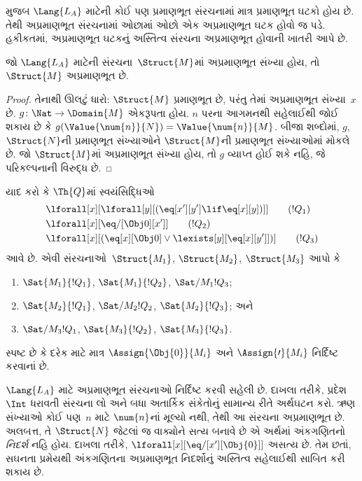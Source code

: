 \begin{explain}
 મુજબ $\Lang{L_A}$ માટેની કોઈ પણ
પ્રમાણભૂત સંરચનામાં માત્ર પ્રમાણભૂત ઘટકો હોય છે. તેથી
અપ્રમાણભૂત સંરચનામાં ઓછામાં ઓછો એક અપ્રમાણભૂત ઘટક હોવો જ પડે.
હકીકતમાં, અપ્રમાણભૂત ઘટકનું અસ્તિત્વ સંરચના અપ્રમાણભૂત હોવાની
ખાતરી આપે છે.
\end{explain}

\begin{prop}
જો $\Lang{L_A}$ માટેની સંરચના~$\Struct{M}$માં અપ્રમાણભૂત
સંખ્યા હોય, તો $\Struct{M}$ અપ્રમાણભૂત છે.
\end{prop}

\begin{proof}
તેનાથી ઊલટું ધારો: $\Struct{M}$ પ્રમાણભૂત છે, પરંતુ તેમાં અપ્રમાણભૂત
સંખ્યા~$x$ છે. $g\colon\Nat\to\Domain{M}$ એકરૂપતા હોય. $n$ પરના
આગમનથી સહેલાઈથી જોઈ શકાય છે કે
$g(\Value{\num{n}}{N})=\Value{\num{n}}{M}$. બીજા શબ્દોમાં, $g$,
$\Struct{N}$ની પ્રમાણભૂત સંખ્યાઓને $\Struct{M}$ની પ્રમાણભૂત
સંખ્યાઓમાં મોકલે છે. જો $\Struct{M}$માં અપ્રમાણભૂત સંખ્યા હોય, તો
$g$ વ્યાપ્ત હોઈ શકે નહિ, જે પરિકલ્પનાની વિરુદ્ધ છે.
\end{proof}

\begin{prob}
યાદ કરો કે $\Th{Q}$માં સ્વયંસિદ્ધિઓ
\begin{align*}
& \lforall[x][\lforall[y][(\eq[x'][y'] \lif \eq[x][y])]] \tag{$!Q_1$}\\
& \lforall[x][\eq/[\Obj 0][x']] \tag{$!Q_2$}\\
& \lforall[x][(\eq[x][\Obj 0] \lor \lexists[y][\eq[x][y']])] \tag{$!Q_3$}
\end{align*}
આવે છે. એવી સંરચનાઓ~$\Struct{M_1}$, $\Struct{M_2}$,
$\Struct{M_3}$ આપો કે
\begin{enumerate}
\item $\Sat{M_1}{!Q_1}$, $\Sat{M_1}{!Q_2}$, $\Sat/{M_1}{!Q_3}$;
\item $\Sat{M_2}{!Q_1}$, $\Sat/{M_2}{!Q_2}$, $\Sat{M_2}{!Q_3}$; અને
\item $\Sat/{M_3}{!Q_1}$, $\Sat{M_3}{!Q_2}$, $\Sat{M_3}{!Q_3}$.
\end{enumerate}
સ્પષ્ટ છે કે દરેક માટે માત્ર $\Assign{\Obj{0}}{M_i}$ અને
$\Assign{\prime}{M_i}$ નિર્દિષ્ટ કરવાનાં છે.
\end{prob}

\begin{explain}
$\Lang{L_A}$ માટે અપ્રમાણભૂત સંરચનાઓ નિર્દિષ્ટ કરવી સહેલી છે.
દાખલા તરીકે, પ્રદેશ~$\Int$ ધરાવતી સંરચના લો અને બધા અતાર્કિક
સંકેતોનું સામાન્ય રીતે અર્થઘટન કરો. ઋણ સંખ્યાઓ કોઈ પણ~$n$ માટે
$\num{n}$નાં મૂલ્યો નથી, તેથી આ સંરચના અપ્રમાણભૂત છે. અલબત્ત, તે
$\Struct{N}$ જેટલાં જ વાક્યોને સત્ય બનાવે છે એ અર્થમાં અંકગણિતનો
\emph{નિદર્શ} નહિ હોય. દાખલા તરીકે,
$\lforall[x][\eq/[x'][\Obj{0}]]$ અસત્ય છે. તેમ છતાં, સઘનતા પ્રમેયથી
અંકગણિતના અપ્રમાણભૂત નિદર્શોનું અસ્તિત્વ સહેલાઈથી સાબિત કરી શકાય છે.
\end{explain}

